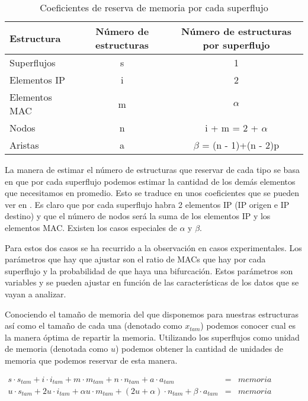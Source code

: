 \documentclass[twoside, 12pt]{epstfg}
\begin{document}
\begin{table}[hbtp]
	\centering
	\small
	\begin{tabular}{lcc}
		\toprule \textbf{Estructura} & \textbf{Número de estructuras}  & \textbf{Número de estructuras por superflujo} \\ \midrule
		Superflujos & s & 1 \\
		Elementos IP & i & 2 \\
		Elementos MAC & m & $\alpha$ \\
		Nodos & n & i + m = 2 + $\alpha$ \\
		Aristas & a & $\beta$ = (n - 1)+(n - 2)p \\ \bottomrule
	\end{tabular}
	\caption{Coeficientes de reserva de memoria por cada superflujo}
	\label{tab:Desarrollo:Coeficientes memoria}
\end{table}

La manera de estimar el número de estructuras que reservar de cada tipo se basa en que por cada superflujo podemos estimar la cantidad de los demás elementos que necesitamos en promedio. Esto se traduce en unos coeficientes que se pueden ver en . Es claro que por cada superflujo habra 2 elementos IP (IP origen e IP destino) y que el número de nodos será la suma de los elementos IP y los elementos MAC. Existen los casos especiales de $\alpha$ y $\beta$.

Para estos dos casos se ha recurrido a la observación en casos experimentales. Los parámetros que hay que ajustar son el ratio de MACs que hay por cada superflujo y la probabilidad de que haya una bifurcación. Estos parámetros son variables y se pueden ajustar en función de las características de los datos que se vayan a analizar.

Conociendo el tamaño de memoria del que disponemos para nuestras estructuras así como el tamaño de cada una (denotado como $x_{tam}$) podemos conocer cual es la manera óptima de repartir la memoria. Utilizando los superflujos como unidad de memoria (denotada como $u$) podemos obtener la cantidad de unidades de memoria que podemos reservar de esta manera.

$\begin{array}{lcl}
	s \cdot s_{tam} + i \cdot i_{tam} + m \cdot m_{tam} + n \cdot n_{tam} + a \cdot a_{tam} & = & memoria\\
	u \cdot s_{tam} + 2u \cdot i_{tam} + \alpha u \cdot m_{tam} + (2u+\alpha) \cdot n_{tam} + \beta \cdot a_{tam} & = & memoria
\end{array}$
\end{document}
